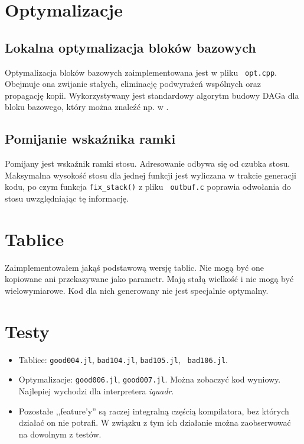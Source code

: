 \documentclass[a4paper,12pt]{article}
\begin{document}
\section{Optymalizacje}

\subsection{Lokalna optymalizacja bloków bazowych}

Optymalizacja bloków bazowych zaimplementowana jest w pliku {\tt
opt.cpp}. Obejmuje ona zwijanie stałych, eliminację podwyrażeń wspólnych
oraz propagację kopii. Wykorzystywany jest standardowy algorytm budowy
DAGa dla bloku bazowego, który można znaleźć np. w \cite{kompilatory}.

\subsection{Pomijanie wskaźnika ramki}

Pomijany jest wskaźnik ramki stosu. Adresowanie odbywa się od czubka
stosu. Maksymalna wysokość stosu dla jednej funkcji jest wyliczana w
trakcie generacji kodu, po czym funkcja {\tt fix\_stack()} z pliku {\tt
outbuf.c} poprawia odwołania do stosu uwzględniając tę informację.

\section{Tablice}

Zaimplementowałem jakąś podstawową wersję tablic. Nie mogą być one
kopiowane ani przekazywane jako parametr. Mają stałą wielkość i nie mogą
być wielowymiarowe. Kod dla nich generowany nie jest specjalnie
optymalny.

\section{Testy}

\begin{itemize}
 \item Tablice: {\tt good004.jl}, {\tt bad104.jl}, {\tt bad105.jl}, {\tt
       bad106.jl}.
 \item Optymalizacje: {\tt good006.jl}, {\tt good007.jl}. Można zobaczyć
       kod wyniowy. Najlepiej wychodzi dla interpretera {\em iquadr}.
 \item Pozostałe ,,feature'y'' są raczej integralną częścią kompilatora,
       bez których działać on nie potrafi. W związku z tym ich działanie
       można zaobserwować na dowolnym z testów.
\end{itemize}
\end{document}
